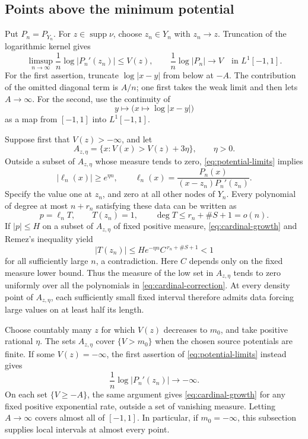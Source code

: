 \documentclass[11pt]{article}
\theoremstyle{definition}
\numberwithin{equation}{section}
\DeclareMathOperator{\supp}{supp}
\begin{document}
\subsection{Points above the minimum potential}
\label{subsec:high-potential}

Put \(P_n=P_{Y_n}\).
For \(z\in\supp\nu\), choose \(z_n\in Y_n\) with \(z_n\to z\).
Truncation of the logarithmic kernel gives
\begin{equation}\label{eq:potential-limits}
 \limsup_{n\to\infty}\frac1n\log|P_n'(z_n)|\le V(z),
 \qquad
 \frac1n\log|P_n|\longrightarrow V
 \quad\text{in }L^1[-1,1].
\end{equation}
For the first assertion, truncate \(\log|x-y|\) from below at
\(-A\). The contribution of the omitted diagonal term is \(A/n\);
one first takes the weak limit and then lets \(A\to\infty\).
For the second, use the continuity of
\[
 y\longmapsto\bigl(x\longmapsto\log|x-y|\bigr)
\]
as a map from \([-1,1]\) into \(L^1[-1,1]\).

Suppose first that \(V(z)>-\infty\), and let
\[
 A_{z,\eta}=\{x:V(x)>V(z)+3\eta\},\qquad \eta>0.
\]
Outside a subset of \(A_{z,\eta}\) whose measure tends to zero,
\eqref{eq:potential-limits} implies
\begin{equation}\label{eq:cardinal-growth}
 |\ell_n(x)|\ge e^{\eta n},
 \qquad
 \ell_n(x)=\frac{P_n(x)}{(x-z_n)P_n'(z_n)}.
\end{equation}
Specify the value one at \(z_n\), and zero at all other nodes of
\(Y_n\). Every polynomial of degree at most \(n+r_n\) satisfying
these data can be written as
\begin{equation}\label{eq:cardinal-correction}
 p=\ell_n T,\qquad T(z_n)=1,\qquad
 \deg T\le r_n+\#S+1=o(n).
\end{equation}
If \(|p|\le H\) on a subset of \(A_{z,\eta}\) of fixed positive
measure, \eqref{eq:cardinal-growth} and Remez's inequality
\cite[p.~93, (3)--(4)]{Remez36} yield
\[
 |T(z_n)|\le He^{-\eta n}C^{\,r_n+\#S+1}<1
\]
for all sufficiently large \(n\), a contradiction.
Here \(C\) depends only on the fixed measure lower bound.
Thus the measure of the low set in \(A_{z,\eta}\) tends to zero
uniformly over all the polynomials in \eqref{eq:cardinal-correction}.
At every density point of \(A_{z,\eta}\), each sufficiently small
fixed interval therefore admits data forcing large values on at
least half its length.

Choose countably many \(z\) for which \(V(z)\) decreases to \(m_0\),
and take positive rational \(\eta\).
The sets \(A_{z,\eta}\) cover \(\{V>m_0\}\) when the chosen source
potentials are finite.
If some \(V(z)=-\infty\), the first assertion of
\eqref{eq:potential-limits} instead gives
\[
 \frac1n\log|P_n'(z_n)|\longrightarrow-\infty.
\]
On each set \(\{V\ge-A\}\), the same argument gives
\eqref{eq:cardinal-growth} for any fixed positive exponential rate,
outside a set of vanishing measure. Letting \(A\to\infty\) covers
almost all of \([-1,1]\).
In particular, if \(m_0=-\infty\), this subsection supplies local
intervals at almost every point.
\end{document}
